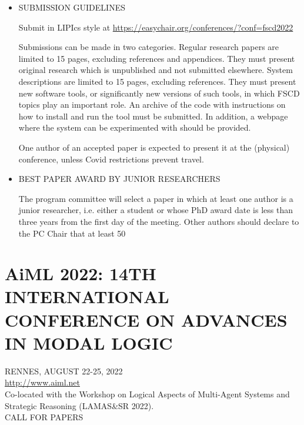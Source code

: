 \documentclass[prodmode,acmtecs]{acmsmall} %
\begin{document}
\begin{itemize}
\item  SUBMISSION GUIDELINES  
 
  Submit in LIPIcs style at \href{https://easychair.org/conferences/?conf=fscd2022}{https://easychair.org/conferences/?conf=fscd2022} 
 
  Submissions can be made in two categories.  Regular research papers are limited to 15 pages, excluding references and appendices.  They must present original research which is unpublished and not submitted elsewhere.  System descriptions are limited to 15 pages, excluding references.  They must present new software tools, or significantly new versions of such tools, in which FSCD topics play an important role. An archive of the code with instructions on how to install and run the tool must be submitted.  In addition, a webpage where the system can be experimented with should be provided. 
 
  One author of an accepted paper is expected to present it at the (physical) conference, unless Covid restrictions prevent travel. 
 
\item  BEST PAPER AWARD BY JUNIOR RESEARCHERS 
 
  The program committee will select a paper in which at least one author is a junior researcher, i.e. either a student or whose PhD award date is less than three years from the first day of the meeting. Other authors should declare to the PC Chair that at least 50%
 
\end{itemize}\section{AiML 2022: 14TH INTERNATIONAL CONFERENCE ON ADVANCES IN MODAL LOGIC}\label{AiML2022}  RENNES, AUGUST 22-25, 2022\\ 
  \href{http://www.aiml.net}{http://www.aiml.net}  \\ 
  Co-located with the Workshop on Logical Aspects of Multi-Agent Systems and Strategic Reasoning (LAMAS\&SR 2022).  \\ 
CALL FOR PAPERS 
\end{document}
